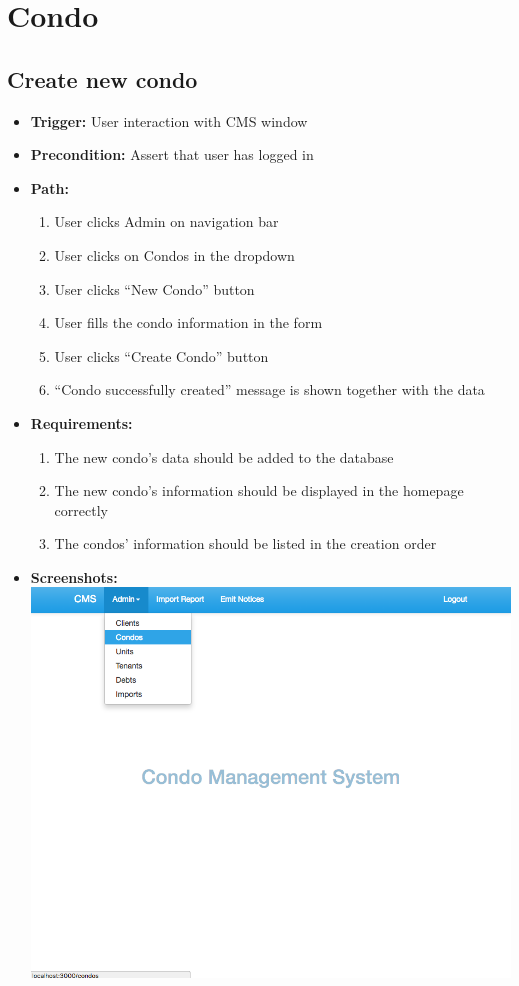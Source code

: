 \section*{Condo}

\subsection*{Create new condo}

\begin{itemize}
  \item[] \textbf{Trigger:} User interaction with CMS window
  \item[] \textbf{Precondition:} Assert that user has logged in
  \item[] \textbf{Path:}
    \begin{enumerate}
      \item User clicks Admin on navigation bar
      \item User clicks on Condos in the dropdown
      \item User clicks ``New Condo'' button
      \item User fills the condo information in the form
      \item User clicks ``Create Condo'' button
      \item ``Condo successfully created'' message is shown together with the data
    \end{enumerate}
  \item[] \textbf{Requirements:}
    \begin{enumerate}
      \item The new condo's data should be added to the database
      \item The new condo's information should be displayed in the homepage correctly
      \item The condos' information should be listed in the creation order
    \end{enumerate}
  \item[] \textbf{Screenshots:} \\
    \includegraphics[scale=0.25]{./images/ss/condo/create/1.png}

\end{itemize}

